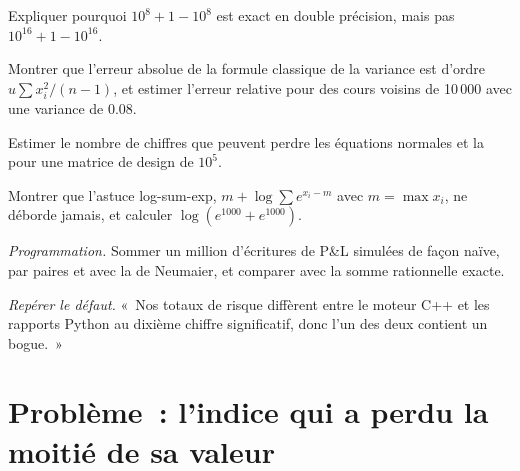 \begin{exercise}[$\star$]\label{exo:qm:floating-point-and-numerical-linear-algebra:3}
Expliquer pourquoi $10^8 + 1 - 10^8$ est exact en double précision, mais pas $10^{16} + 1 - 10^{16}$.
\end{exercise}

\begin{exercise}[$\star\star$]\label{exo:qm:floating-point-and-numerical-linear-algebra:4}
Montrer que l'erreur absolue de la formule classique de la variance est d'ordre $u\sum x_i^2/(n - 1)$, et estimer l'erreur relative pour des cours voisins de 10\,000 avec une variance de 0.08.
\end{exercise}

\begin{exercise}[$\star\star$]\label{exo:qm:floating-point-and-numerical-linear-algebra:5}
Estimer le nombre de chiffres que peuvent perdre les équations normales et la  pour une matrice de design de  $10^5$.
\end{exercise}

\begin{exercise}[$\star\star$]\label{exo:qm:floating-point-and-numerical-linear-algebra:6}
Montrer que l'astuce log-sum-exp, $m + \log\sum e^{x_i - m}$ avec $m = \max x_i$, ne déborde jamais, et calculer $\log(e^{1000} + e^{1000})$.
\end{exercise}

\begin{exercise}[$\star\star\star$]\label{exo:qm:floating-point-and-numerical-linear-algebra:7}
\emph{Programmation.} Sommer un million d'écritures de P\&L simulées de façon naïve, par paires et avec la  de Neumaier, et comparer avec la somme rationnelle exacte.
\end{exercise}

\begin{exercise}[$\star\star\star$]\label{exo:qm:floating-point-and-numerical-linear-algebra:8}
\emph{Repérer le défaut.} «~Nos totaux de risque diffèrent entre le moteur C++ et les rapports Python au dixième chiffre significatif, donc l'un des deux contient un bogue.~»
\end{exercise}

\section{Problème~: l'indice qui a perdu la moitié de sa valeur}

